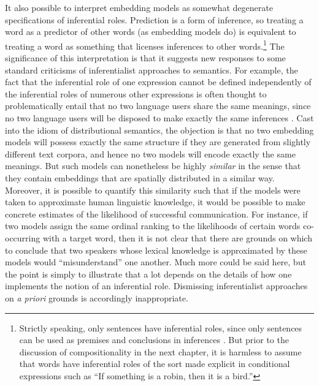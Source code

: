 It also possible to interpret embedding models as somewhat degenerate specifications of inferential roles. Prediction is a form of inference, so treating a word as a predictor of other words (as embedding models do) is equivalent to treating a word as something that licenses inferences to other words.\footnote{Strictly speaking, only sentences have inferential roles, since only sentences can be used as premises and conclusions in inferences \citep{Brandom:1994}. But prior to the discussion of compositionality in the next chapter, it is harmless to assume that words have inferential roles of the sort made explicit in conditional expressions such as ``If something is a robin, then it is a bird.''} The significance of this interpretation is that it suggests new responses to some standard criticisms of inferentialist approaches to semantics. For example, the fact that the inferential role of one expression cannot be defined independently of the inferential roles of numerous other expressions is often thought to problematically entail that no two language users share the same meanings, since no two language users will be disposed to make exactly the same inferences \citep{FodorLepore:1991,FodorLepore:2002}. Cast into the idiom of distributional semantics, the objection is that no two embedding models will possess exactly the same structure if they are generated from slightly different text corpora, and hence no two models will encode exactly the same meanings. But such models can nonetheless be highly \textit{similar} in the sense that they contain embeddings that are spatially distributed in a similar way. Moreover, it is possible to quantify this similarity such that if the models were taken to approximate human linguistic knowledge, it would be possible to make concrete estimates of the likelihood of successful communication. For instance, if two models assign the same ordinal ranking to the likelihoods of certain words co-occurring with a target word, then it is not clear that there are grounds on which to conclude that two speakers whose lexical knowledge is approximated by these models would ``misunderstand'' one another. Much more could be said here, but the point is simply to illustrate that a lot depends on the details of how one implements the notion of an inferential role. Dismissing inferentialist approaches on \textit{a priori} grounds is accordingly inappropriate.

